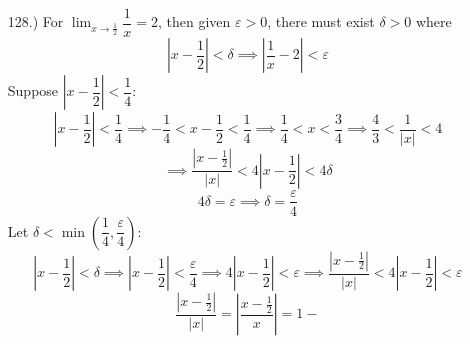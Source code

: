 \documentclass[12pt]{article}
\newcommand{\vertb}[1]{\left\vert#1\right\vert}
\newcommand{\parns}[1]{\left(#1\right)}
\newcommand{\e}{\varepsilon}
\newcommand{\lm}[1]{\displaystyle\lim_{#1}}
\begin{document}
\begin{itemize}
    \item [128.)] For $\lm{x\to\frac{1}{2}}\dfrac{1}{x}=2$, then given $\e>0$, there must exist $\delta>0$ where
    \[\vertb{x-\frac{1}{2}}<\delta\implies\vertb{\frac{1}{x}-2}<\e\]
    Suppose $\vertb{x-\dfrac{1}{2}}<\dfrac{1}{4}$:
    \[\vertb{x-\frac{1}{2}}<\frac{1}{4}\implies-\frac{1}{4}<x-\frac{1}{2}<\frac{1}{4}\implies\frac{1}{4}<x<\frac{3}{4}\implies\frac{4}{3}<\frac{1}{\vertb{x}}<4\]
    \[\implies\frac{\vertb{x-\frac{1}{2}}}{\vertb{x}}<4\vertb{x-\frac{1}{2}}<4\delta\]
    \[4\delta=\e\implies\delta=\frac{\e}{4}\]
    Let $\delta<\min\parns{\dfrac{1}{4},\dfrac{\e}{4}}$:
    \[\vertb{x-\frac{1}{2}}<\delta\implies\vertb{x-\frac{1}{2}}<\frac{\e}{4}\implies4\vertb{x-\frac{1}{2}}<\e\implies\frac{\vertb{x-\frac{1}{2}}}{\vertb{x}}<4\vertb{x-\frac{1}{2}}<\e\]
    \[\frac{\vertb{x-\frac{1}{2}}}{\vertb{x}}=\vertb{\frac{x-\frac{1}{2}}{x}}=1-\]










\end{itemize}
\end{document}
